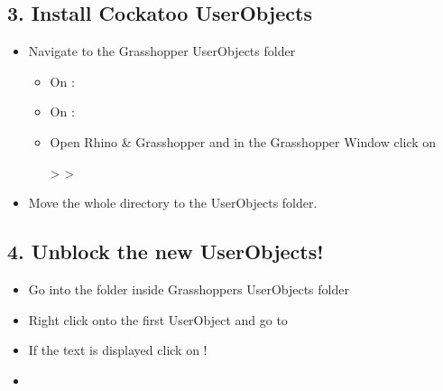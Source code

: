 \documentclass[letterpaper,10pt,english]{sphinxmanual}
\begin{document}
\subsection{3. Install Cockatoo UserObjects}
\label{\detokenize{README:install-cockatoo-userobjects}}\label{\detokenize{README:id4}}\begin{itemize}
\item {} 
Navigate to the Grasshopper UserObjects folder
\begin{itemize}
\item {} 
On :


\item {} 
On :


\item {} 
 Open Rhino \& Grasshopper and in the Grasshopper
Window click on

 \textgreater{}  \textgreater{} 

\end{itemize}

\item {} 
Move the whole  directory to the UserObjects folder.

\end{itemize}


\subsection{4. Unblock the new UserObjects!}
\label{\detokenize{README:unblock-the-new-userobjects}}\label{\detokenize{README:id5}}\begin{itemize}
\item {} 
Go into the  folder inside Grasshoppers UserObjects
folder

\item {} 
Right click onto the first UserObject and go to 

\item {} 
If the text  is displayed
click on !

\item {} 

\end{itemize}
\end{document}
